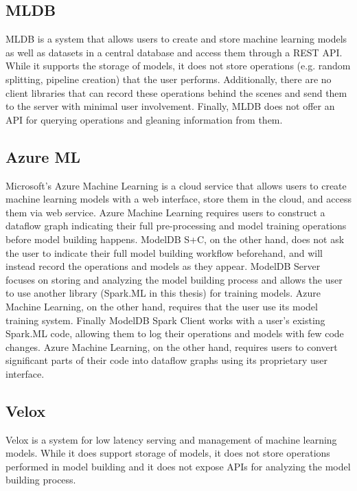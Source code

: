 \subsection{MLDB}
MLDB \cite{mldb} is a system that allows users to create and store machine learning
models as well as datasets in a central database and access them through a REST API. 
While it supports the storage of models, it does not store operations (e.g. random splitting,
pipeline creation) that the user performs. Additionally, there are no client libraries
that can record these operations behind the scenes and send them to the server with
minimal user involvement. Finally, MLDB does not offer an API for querying operations
and gleaning information from them.

\subsection{Azure ML}
Microsoft's Azure Machine Learning \cite{azureml} is a cloud service that allows users
to create machine learning models with a web interface, store them in the cloud, and
access them via web service. Azure Machine Learning requires users to construct a dataflow 
graph indicating their full pre-processing and model training operations before model building
happens. ModelDB S+C, on the other hand, does not ask the user to indicate their full model building
workflow beforehand, and will instead record the operations and models as they appear. ModelDB Server
focuses on storing and analyzing the model building process and allows the user to use another library
(Spark.ML in this thesis) for training models. Azure Machine Learning, on the other hand, requires
that the user use its model training system. Finally ModelDB Spark Client works with a user's existing
Spark.ML code, allowing them to log their operations and models with few code changes. Azure Machine
Learning, on the other hand, requires users to convert significant parts of their code into
dataflow graphs using its proprietary user interface.

\subsection{Velox}
Velox \cite{velox} is a system for low latency serving and management of machine learning models.
While it does support storage of models, it does not store operations performed in model building and it
does not expose APIs for analyzing the model building process.

